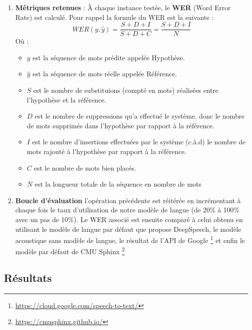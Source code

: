 \begin{enumerate}
		\item \textbf{Métriques retenues} : À chaque instance testée, le \textbf{WER} (Word Error Rate) est calculé. Pour rappel la formule du WER est la suivante :
		\begin{equation*}
			WER(y,\hat{y}) = \frac{S+D+I}{S+D+C} = \frac{S+D+I}{N}
		\end{equation*}
		Où : 
		\begin{itemize}
			\item $y$ est la séquence de mots prédite appelée Hypothèse.
			\item $\hat{y}$ est la séquence de mots réelle appelée Référence.
			\item $S$ est le nombre de substituions (compté en mots) réalisées entre l'hypothèse et la référence.
			\item $D$ est le nombre de suppressions qu'a effectué le système. donc le nombre de mots supprimés dans l'hypothèse par rapport à la référence.
			\item $I$ est le nombre d'insertions effectuées par le système (c.à.d) le nombre de mots rajouté à l'hypothèse par rapport à la référence.
			\item $C$ est le nombre de mots bien placés.
			\item $N$ est la longueur totale de la séquence en nombre de mots
		\end{itemize}
		\item \textbf{Boucle d'évaluation} l'opération précédente est réitérée en incrémentant à chaque fois le taux d'utilisation de notre modèle de langue (de 20\% à 100\% avec un pas de 10\%). Le WER associé est ensuite comparé à celui obtenu en utilisant le modèle de langue par défaut que propose DeepSpeech, le modèle acoustique sans modèle de langue, le résultat de l'API de Google \footnote{\url{https://cloud.google.com/speech-to-text/}} et enfin le modèle par défaut de CMU Sphinx \footnote{\url{https://cmusphinx.github.io/}}
		
	\end{enumerate}
	\subsection{Résultats}
